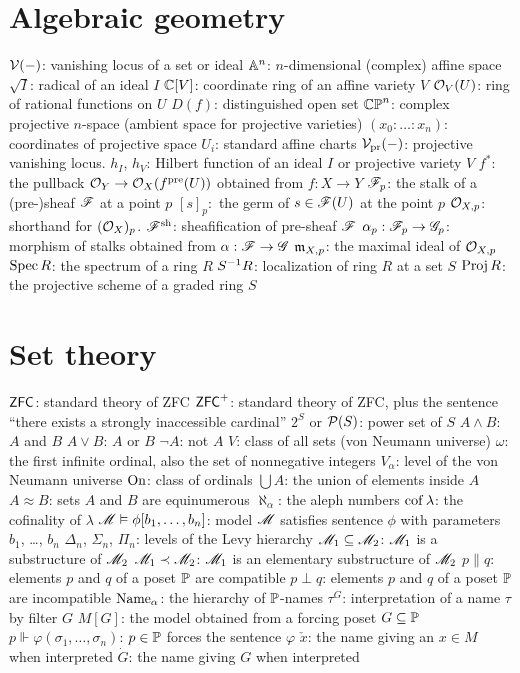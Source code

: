\section{Algebraic geometry}
\begin{itemize}
	\ii $\mathcal V(-)$: vanishing locus of a set or ideal
	\ii $\mathbb A^n$: $n$-dimensional (complex) affine space
	\ii $\sqrt I$: radical of an ideal $I$
	\ii $\mathbb C[V]$: coordinate ring of an affine variety $V$
	\ii $\mathcal O_V(U)$: ring of rational functions on $U$
	\ii $D(f)$: distinguished open set
	\ii $\mathbb{CP}^n$: complex projective $n$-space (ambient space for projective varieties)
	\ii $(x_0 : \dots : x_n)$: coordinates of projective space
	\ii $U_i$: standard affine charts
	\ii $\mathcal V_{\text{pr}}(-)$: projective vanishing locus.
	\ii $h_I$, $h_V$: Hilbert function of an ideal $I$ or projective variety $V$
	\ii $f^\ast$: the pullback $\mathcal O_Y \to \mathcal O_X(f^{\text{pre}}(U))$ obtained from $f : X \to Y$
	\ii $\mathscr F_p$: the stalk of a (pre-)sheaf $\mathscr F$ at a point $p$
	\ii $[s]_p:$ the germ of $s \in \mathscr F(U)$ at the point $p$
	\ii $\mathcal O_{X,p}$: shorthand for $(\mathcal O_X)_p$.
	\ii $\mathscr F^\mathrm{sh}$: sheafification of pre-sheaf $\mathscr F$
	\ii $\alpha_p : \mathscr F_p \to \mathscr G_p$: morphism of stalks obtained from $\alpha : \mathscr F \to \mathscr G$
	\ii $\mathfrak m_{X,p}$: the maximal ideal of $\mathcal O_{X,p}$
	\ii $\operatorname{Spec} R$: the spectrum of a ring $R$
	\ii $S^{-1} R$: localization of ring $R$ at a set $S$
	\ii $\operatorname{Proj} R$: the projective scheme of a graded ring $S$
\end{itemize}

\section{Set theory}
\begin{itemize}
	\ii $\mathsf{ZFC}$: standard theory of ZFC
	\ii $\mathsf{ZFC}^+$: standard theory of ZFC, plus the sentence
	``there exists a strongly inaccessible cardinal''
	\ii $2^S$ or $\mathcal P(S)$: power set of $S$
	\ii $A \land B$: $A$ and $B$
	\ii $A \lor B$: $A$ or $B$
	\ii $\neg A$: not $A$
	\ii $V$: class of all sets (von Neumann universe)
	\ii $\omega$: the first infinite ordinal, also the set of nonnegative integers
	\ii $V_\alpha$: level of the von Neumann universe
	\ii $\mathrm{On}$: class of ordinals
	\ii $\bigcup A$: the union of elements inside $A$
	\ii $A \approx B$: sets $A$ and $B$ are equinumerous
	\ii $\aleph_\alpha$: the aleph numbers
	\ii $\operatorname{cof} \lambda$: the cofinality of $\lambda$
	\ii $\mathscr M \vDash \phi[b_1, \dots, b_n]$: model $\mathscr M$ satisfies sentence $\phi$
	with parameters $b_1$, \dots, $b_n$
	\ii $\Delta_n$, $\Sigma_n$, $\Pi_n$: levels of the Levy hierarchy
	\ii $\mathscr M_1 \subseteq \mathscr M_2$: $\mathscr M_1$ is a substructure of $\mathscr M_2$
	\ii $\mathscr M_1 \prec \mathscr M_2$: $\mathscr M_1$ is an elementary substructure of $\mathscr M_2$
	\ii $p \parallel q$: elements $p$ and $q$ of a poset $\mathbb P$ are compatible
	\ii $p \perp q$: elements $p$ and $q$ of a poset $\mathbb P$ are incompatible
	\ii $\text{Name}_\alpha$: the hierarchy of $\mathbb P$-names
	\ii $\tau^G$: interpretation of a name $\tau$ by filter $G$
	\ii $M[G]$: the model obtained from a forcing poset $G \subseteq \mathbb P$
	\ii $p \Vdash \varphi(\sigma_1, \dots, \sigma_n)$: $p \in \mathbb P$ forces the sentence $\varphi$
	\ii $\check x$: the name giving an $x \in M$ when interpreted
	\ii $\dot G$: the name giving $G$ when interpreted
\end{itemize}


